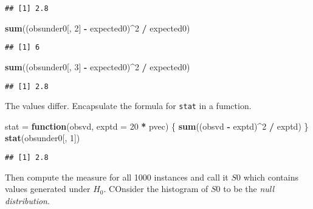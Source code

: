 \documentclass[]{article}
\newenvironment{Shaded}{\begin{snugshade}}{\end{snugshade}}
\newcommand{\KeywordTok}[1]{\textcolor[rgb]{0.13,0.29,0.53}{\textbf{#1}}}
\newcommand{\DataTypeTok}[1]{\textcolor[rgb]{0.13,0.29,0.53}{#1}}
\newcommand{\DecValTok}[1]{\textcolor[rgb]{0.00,0.00,0.81}{#1}}
\newcommand{\StringTok}[1]{\textcolor[rgb]{0.31,0.60,0.02}{#1}}
\newcommand{\ControlFlowTok}[1]{\textcolor[rgb]{0.13,0.29,0.53}{\textbf{#1}}}
\newcommand{\OperatorTok}[1]{\textcolor[rgb]{0.81,0.36,0.00}{\textbf{#1}}}
\newcommand{\NormalTok}[1]{#1}
\begin{document}
\begin{verbatim}
## [1] 2.8
\end{verbatim}

\begin{Shaded}
\begin{Highlighting}[]
\KeywordTok{sum}\NormalTok{((obsunder0[, }\DecValTok{2}\NormalTok{] }\OperatorTok{-}\StringTok{ }\NormalTok{expected0)}\OperatorTok{^}\DecValTok{2} \OperatorTok{/}\StringTok{ }\NormalTok{expected0)}
\end{Highlighting}
\end{Shaded}

\begin{verbatim}
## [1] 6
\end{verbatim}

\begin{Shaded}
\begin{Highlighting}[]
\KeywordTok{sum}\NormalTok{((obsunder0[, }\DecValTok{3}\NormalTok{] }\OperatorTok{-}\StringTok{ }\NormalTok{expected0)}\OperatorTok{^}\DecValTok{2} \OperatorTok{/}\StringTok{ }\NormalTok{expected0)}
\end{Highlighting}
\end{Shaded}

\begin{verbatim}
## [1] 2.8
\end{verbatim}

The values differ. Encapsulate the formula for \texttt{stat} in a
fumction.

\begin{Shaded}
\begin{Highlighting}[]
\NormalTok{stat =}\StringTok{ }\ControlFlowTok{function}\NormalTok{(obsvd, }\DataTypeTok{exptd =} \DecValTok{20} \OperatorTok{*}\StringTok{ }\NormalTok{pvec) \{}
  \KeywordTok{sum}\NormalTok{((obsvd }\OperatorTok{-}\StringTok{ }\NormalTok{exptd)}\OperatorTok{^}\DecValTok{2} \OperatorTok{/}\StringTok{ }\NormalTok{exptd)}
\NormalTok{\}}
\KeywordTok{stat}\NormalTok{(obsunder0[, }\DecValTok{1}\NormalTok{])}
\end{Highlighting}
\end{Shaded}

\begin{verbatim}
## [1] 2.8
\end{verbatim}

Then compute the measure for all 1000 instances and call it \(S0\) which
contains values generated under \(H_0\). COnsider the histogram of
\(S0\) to be the \emph{null distribution}.
\end{document}

